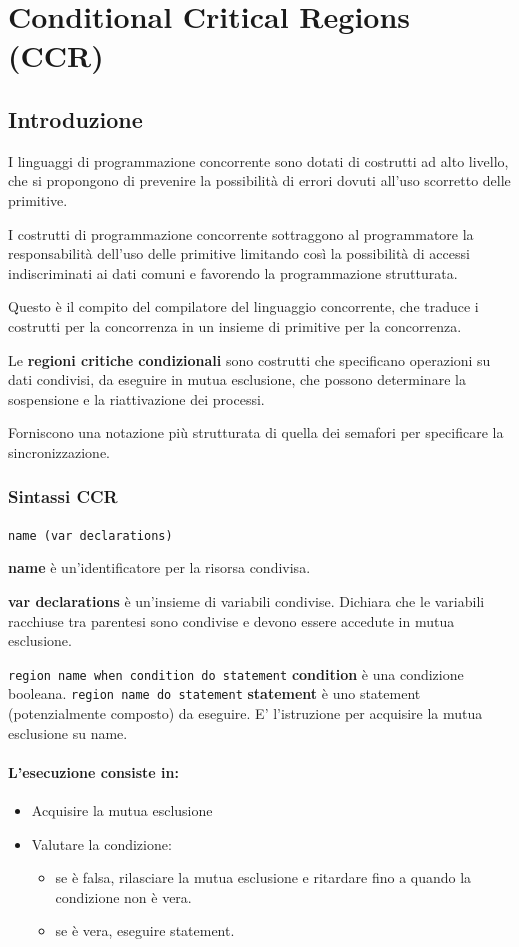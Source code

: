 \section{Conditional Critical Regions (CCR)}
\subsection{Introduzione}
I linguaggi di programmazione concorrente sono dotati di costrutti ad alto livello, che si propongono di prevenire la
possibilità di errori dovuti all'uso scorretto delle primitive.

I costrutti di programmazione concorrente sottraggono al programmatore la responsabilità dell'uso delle primitive
limitando così la possibilità di accessi indiscriminati ai dati comuni e favorendo la programmazione strutturata.

Questo è il compito del compilatore del linguaggio concorrente, che traduce i costrutti per la concorrenza in un insieme di primitive per la concorrenza.

Le \textbf{regioni critiche condizionali} sono costrutti che specificano operazioni su dati condivisi, da eseguire
in mutua esclusione, che possono determinare la sospensione e la riattivazione dei processi.

Forniscono una notazione più strutturata di quella dei semafori per specificare la sincronizzazione.

\subsubsection{Sintassi CCR} 

\lstinline{name (var declarations)}

\textbf{name} è un'identificatore per la risorsa condivisa.

\textbf{var declarations} è un'insieme di variabili condivise.
Dichiara che le variabili racchiuse tra parentesi sono condivise e devono essere accedute in mutua esclusione.

\lstinline{region name when condition do statement}
\textbf{condition} è una condizione booleana.
\lstinline{region name do statement}
\textbf{statement} è uno statement (potenzialmente composto) da eseguire. E' l'istruzione per acquisire la mutua esclusione su name.



\paragraph{L'esecuzione consiste in:}
\begin{itemize}
    \item Acquisire la mutua esclusione
    \item Valutare la condizione:
        \begin{itemize}
            \item se è falsa, rilasciare la mutua esclusione e ritardare fino a quando la condizione non è vera.
            \item se è vera, eseguire statement.
        \end{itemize}
\end{itemize}

